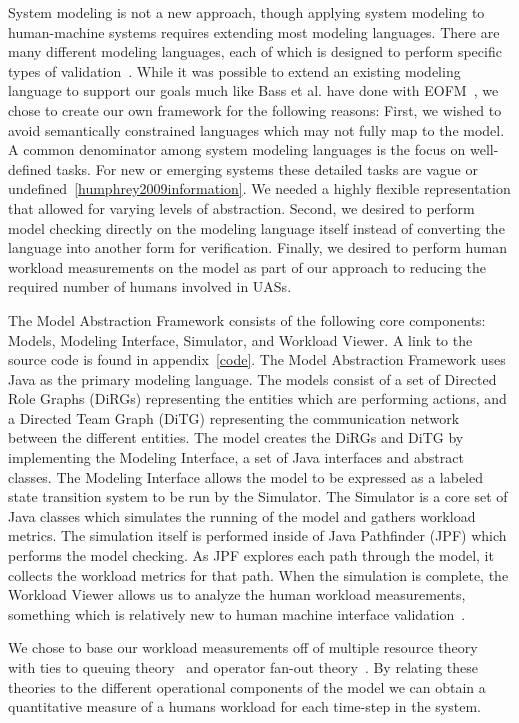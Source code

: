 System modeling is not a new approach, though applying system modeling to human-machine systems requires extending most modeling languages.  There are many different modeling languages, each of which is designed to perform specific types of validation~\cite{bolton2013litreview}.  While it was possible to extend an existing modeling language to support our goals much like Bass et al. have done with EOFM~\cite{bass2011toward}, we chose to create our own framework for the following reasons:  
First, we wished to avoid semantically constrained languages which may not fully map to the model.  A common denominator among system modeling languages is the focus on well-defined tasks.  For new or emerging systems these detailed tasks are vague or undefined~\ref{humphrey2009information}.  We needed a highly flexible representation that allowed for varying levels of abstraction.  
Second, we desired to perform model checking directly on the modeling language itself instead of converting the language into another form for verification.
Finally, we desired to perform human workload measurements on the model as part of our approach to reducing the required number of humans involved in UASs.

The Model Abstraction Framework consists of the following core components:  Models, Modeling Interface, Simulator, and Workload Viewer.  A link to the source code is found in appendix~\ref{code}.  The Model Abstraction Framework uses Java as the primary modeling language.  The models consist of a set of Directed Role Graphs (DiRGs) representing the entities which are performing actions, and a Directed Team Graph (DiTG) representing the communication network between the different entities.  The model creates the DiRGs and DiTG by implementing the Modeling Interface, a set of Java interfaces and abstract classes.  The Modeling Interface allows the model to be expressed as a labeled state transition system to be run by the Simulator.  The Simulator is a core set of Java classes which simulates the running of the model and gathers workload metrics.  The simulation itself is performed inside of Java Pathfinder (JPF) which performs the model checking.  As JPF explores each path through the model, it collects the workload metrics for that path.  When the simulation is complete, the Workload Viewer allows us to analyze the human workload measurements, something which is relatively new to human machine interface validation~\cite{bolton2013litreview}.

We chose to base our workload measurements off of multiple resource theory~\cite{wickens2002multiple} with ties to queuing theory~\cite{newell1994unified} and operator fan-out theory~\cite{goodrich2010fanout}.  By relating these theories to the different operational components of the model we can obtain a quantitative measure of a humans workload for each time-step in the system.

